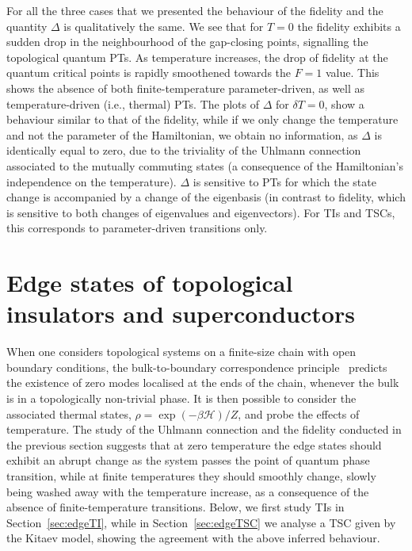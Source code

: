 For all the three cases that we presented the behaviour of the fidelity and the quantity $\Delta$ is qualitatively the same.
We see that for $T=0$ the fidelity exhibits a sudden drop in the neighbourhood of the gap-closing points, signalling the topological quantum PTs. As temperature increases, the drop of fidelity at the quantum critical points is rapidly smoothened towards the $F=1$ value. This shows the absence of both finite-temperature parameter-driven, as well as temperature-driven (i.e., thermal) PTs. The plots of $\Delta$ for $\delta T=0$, show a behaviour similar to that of the fidelity, while if we only change the temperature and not the parameter of the Hamiltonian, we obtain no information, as $\Delta$ is identically equal to zero, due to the triviality of the Uhlmann connection associated to the mutually commuting states (a consequence of the Hamiltonian's independence on the temperature). $\Delta$ is sensitive to PTs for which the state change is accompanied by a change of the eigenbasis (in contrast to fidelity, which is sensitive to both changes of eigenvalues and eigenvectors). For TIs and TSCs, this corresponds to parameter-driven transitions only. 
\section{Edge states of topological insulators and superconductors}
\label{sec:edge}
When one considers topological systems on a finite-size chain with open boundary conditions, the bulk-to-boundary correspondence principle~\cite{x:g:wen:91,ryu:hat:02} predicts the existence of zero modes localised at the ends of the chain, whenever the bulk is in a topologically non-trivial phase. It is then possible to consider the associated thermal states, $\rho=\exp(-\beta \mathcal{H})/Z$, and probe the effects of temperature. The study of the Uhlmann connection and the fidelity conducted in the previous section suggests that at zero temperature the edge states should exhibit an abrupt change as the system passes the point of quantum phase transition, while at finite temperatures they should smoothly change, slowly being washed away with the temperature increase, as a consequence of the absence of finite-temperature transitions. Below, we first study TIs in Section~\ref{sec:edgeTI}, while in Section~\ref{sec:edgeTSC} we analyse a TSC given by the Kitaev model, showing the agreement with the above inferred behaviour.

